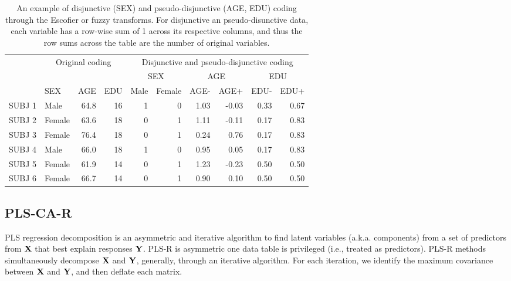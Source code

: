 \documentclass[12pt]{article}
\begin{document}
\begin{table}[!h]

\caption{\label{tab:unnamed-chunk-1}\label{table:disj} An example of disjunctive (SEX) and pseudo-disjunctive (AGE, EDU) coding through the Escofier or fuzzy transforms. For disjunctive an pseudo-disunctive data, each variable has a row-wise sum of 1 across its respective columns, and thus the row sums across the table are the number of original variables.}
\centering
\begin{tabular}[t]{llrrrrrrrr}
\toprule
\multicolumn{1}{c}{ } & \multicolumn{3}{c}{Original coding} & \multicolumn{6}{c}{Disjunctive and pseudo-disjunctive coding} \\
\cmidrule(l{2pt}r{2pt}){2-4} \cmidrule(l{2pt}r{2pt}){5-10}
\multicolumn{4}{c}{ } & \multicolumn{2}{c}{SEX} & \multicolumn{2}{c}{AGE} & \multicolumn{2}{c}{EDU} \\
\cmidrule(l{2pt}r{2pt}){5-6} \cmidrule(l{2pt}r{2pt}){7-8} \cmidrule(l{2pt}r{2pt}){9-10}
  & SEX & AGE & EDU & Male & Female & AGE- & AGE+ & EDU- & EDU+\\
\midrule
SUBJ 1 & Male & 64.8 & 16 & 1 & 0 & 1.03 & -0.03 & 0.33 & 0.67\\
SUBJ 2 & Female & 63.6 & 18 & 0 & 1 & 1.11 & -0.11 & 0.17 & 0.83\\
SUBJ 3 & Female & 76.4 & 18 & 0 & 1 & 0.24 & 0.76 & 0.17 & 0.83\\
SUBJ 4 & Male & 66.0 & 18 & 1 & 0 & 0.95 & 0.05 & 0.17 & 0.83\\
SUBJ 5 & Female & 61.9 & 14 & 0 & 1 & 1.23 & -0.23 & 0.50 & 0.50\\
\addlinespace
SUBJ 6 & Female & 66.7 & 14 & 0 & 1 & 0.90 & 0.10 & 0.50 & 0.50\\
\bottomrule
\end{tabular}
\end{table}

\hypertarget{pls-ca-r}{%
\subsection{PLS-CA-R}\label{pls-ca-r}}

\label{section:plscar_form}

PLS regression
\citep{wold1975soft, wold_collinearity_1984, wold_pls-regression_2001}
decomposition is an asymmetric and iterative algorithm to find latent
variables (a.k.a. components) from a set of predictors from \({\bf X}\)
that best explain responses \({\bf Y}\). PLS-R is asymmetric one data
table is privileged (i.e., treated as predictors). PLS-R methods
simultaneously decompose \({\bf X}\) and \({\bf Y}\), generally, through
an iterative algorithm. For each iteration, we identify the maximum
covariance between \({\bf X}\) and \({\bf Y}\), and then deflate each
matrix.
\end{document}
